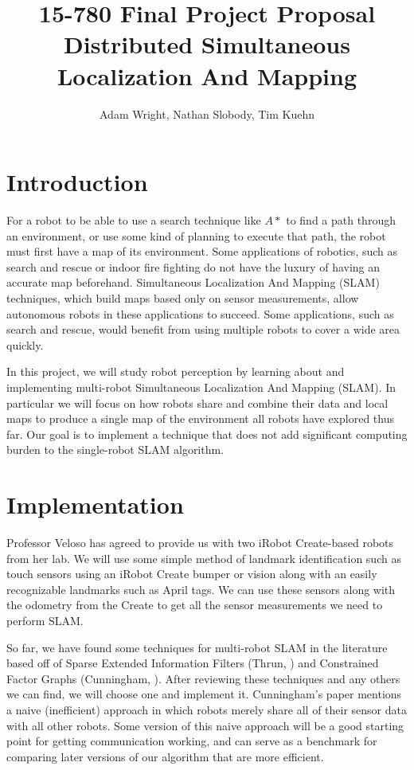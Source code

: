 \documentclass[11pt]{article}
\title{
15-780 Final Project Proposal \\ 
Distributed Simultaneous Localization And Mapping \\
}
\author{Adam Wright, Nathan Slobody, Tim Kuehn}
\begin{document}
\maketitle

\section{Introduction}

For a robot to be able to use a search technique like $A*$ to find a path through an environment, or use some kind of planning to execute that path, the robot must first have a map of its environment. Some applications of robotics, such as search and rescue or indoor fire fighting do not have the luxury of having an accurate map beforehand. Simultaneous Localization And Mapping (SLAM) techniques, which build maps based only on sensor measurements, allow autonomous robots in these applications to succeed. Some applications, such as search and rescue, would benefit from using multiple robots to cover a wide area quickly. 

In this project, we will study robot perception by learning about and implementing multi-robot Simultaneous Localization And Mapping (SLAM). In particular we will focus on how robots share and combine their data and local maps to produce a single map of the environment all robots have explored thus far. Our goal is to implement a technique that does not add significant computing burden to the single-robot SLAM algorithm.

\section{Implementation}

Professor Veloso has agreed to provide us with two iRobot Create-based robots from her lab. We will use some simple method of landmark identification such as touch sensors using an iRobot Create bumper or vision along with an easily recognizable landmarks such as April tags. We can use these sensors along with the odometry from the Create to get all the sensor measurements we need to perform SLAM.

So far, we have found some techniques for multi-robot SLAM in the literature based off of Sparse Extended Information Filters (Thrun, \cite{thrun2003}) and Constrained Factor Graphs (Cunningham, \cite{cunningham2010}). After reviewing these techniques and any others we can find, we will choose one and implement it. Cunningham's paper mentions a naive (inefficient) approach in which robots merely share all of their sensor data with all other robots. Some version of this naive approach will be a good starting point for getting communication working, and can serve as a benchmark for comparing later versions of our algorithm that are more efficient.
\end{document}
